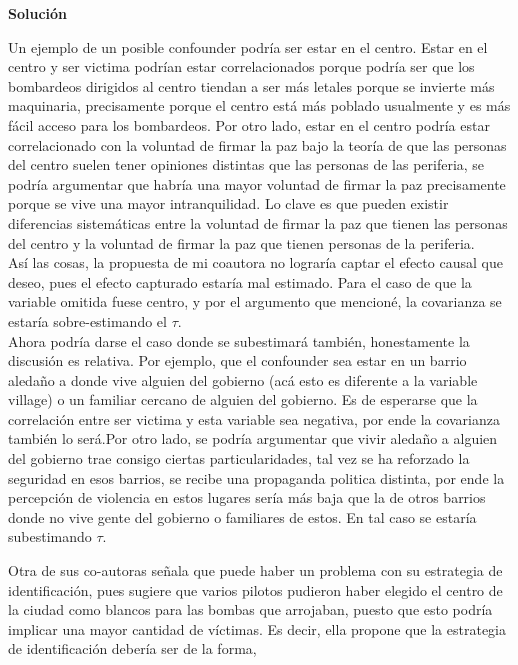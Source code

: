 \documentclass[a4paper, answers, addpoints, 11pt]{exam}
\newenvironment{solucion}{%
  \begin{mdframed}[
    backgroundcolor=blue!5,    %
    linecolor=blue!50,          %
    linewidth=2pt,              %
    leftmargin=10pt,            %
    rightmargin=10pt,           %
    topline=true,              %
    bottomline=true,            %
    roundcorner=10pt,           %
    innerleftmargin=10pt,       %
    innerrightmargin=10pt,      %
    innerbottommargin=10pt,     %
    innertopmargin=10pt         %
  ]%
  \begin{tcolorbox}[colframe=blue!50!black, colback=blue!50, coltitle=white, sharp corners=all, boxrule=1mm, width=\textwidth, halign=left, valign=center, top=0mm, bottom=0mm, left=0mm, right=0mm] \textbf{Solución} \end{tcolorbox} }{\end{mdframed}}
\begin{document}
\begin{enumerate}
\begin{solucion}
        Un ejemplo de un posible confounder podría ser estar en el centro. Estar en el centro y ser victima podrían estar correlacionados porque podría ser que los bombardeos dirigidos al centro tiendan a ser más letales porque se invierte más maquinaria, precisamente porque el centro está más poblado usualmente y es más fácil acceso para los bombardeos. Por otro lado, estar en el centro podría estar correlacionado con la voluntad de firmar la paz bajo la teoría de que las personas del centro suelen tener opiniones distintas que las personas de las periferia, se podría argumentar que habría una mayor voluntad de firmar la paz precisamente porque se vive una mayor intranquilidad. Lo clave es que pueden existir diferencias sistemáticas entre la voluntad de firmar la paz que tienen las personas del centro y la voluntad de firmar la paz que tienen personas de la periferia.\\

        Así las cosas, la propuesta de mi coautora no lograría captar el efecto causal que deseo, pues el efecto capturado estaría mal estimado. Para el caso de que la variable omitida fuese centro, y por el argumento que mencioné, la covarianza se estaría sobre-estimando el $\tau$.\\
        
        Ahora podría darse el caso donde se subestimará también, honestamente la discusión es relativa. Por ejemplo, que el confounder sea estar en un barrio aledaño a donde vive alguien del gobierno (acá esto es diferente a la variable village) o un familiar cercano de alguien del gobierno. Es de esperarse que la correlación entre ser victima y esta variable sea negativa, por ende la covarianza también lo será.Por otro lado, se podría argumentar que vivir aledaño a alguien del gobierno trae consigo ciertas particularidades, tal vez se ha reforzado la seguridad en esos barrios, se recibe una propaganda politica distinta, por ende la percepción de violencia en estos lugares sería más baja que la de otros barrios donde no vive gente del gobierno o familiares de estos. En tal caso se estaría subestimando $\tau$.
        \end{solucion}

    
\end{enumerate}

    Otra de sus co-autoras señala que puede haber un problema con su estrategia de identificación, pues sugiere que varios pilotos pudieron haber elegido el centro de la ciudad como blancos para las bombas que arrojaban, puesto que esto podría implicar una mayor cantidad de víctimas. Es decir, ella propone que la estrategia de identificación debería ser de la forma,
\end{document}
